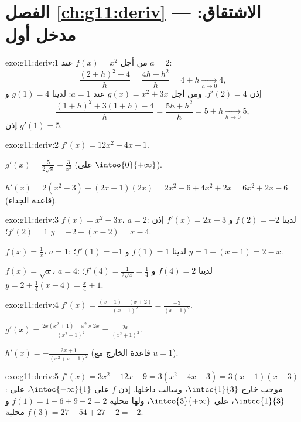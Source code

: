\section*{الفصل \ref{ch:g11:deriv} --- الاشتقاق: مدخل أول}

\begin{solution}{exo:g11:deriv:1}
من أجل $f(x) = x^2$ عند $a = 2$:
\[
\frac{(2+h)^2 - 4}{h} = \frac{4h + h^2}{h} = 4 + h
\xrightarrow[h\to0]{} 4,
\]
إذن $f'(2) = 4$. ومن أجل $g(x) = x^2 + 3x$ عند $a = 1$: لدينا $g(1) = 4$ و
\[
\frac{(1+h)^2 + 3(1+h) - 4}{h} = \frac{5h + h^2}{h} = 5 + h
\xrightarrow[h\to0]{} 5,
\]
إذن $g'(1) = 5$.
\end{solution}

\begin{solution}{exo:g11:deriv:2}
$f'(x) = 12x^2 - 4x + 1$.

$g'(x) = \frac{5}{2\sqrt x} - \frac{3}{x^2}$ (على $\intoo{0}{+\infty}$).

$h'(x) = 2(x^2 - 3) + (2x+1)(2x) = 2x^2 - 6 + 4x^2 + 2x
= 6x^2 + 2x - 6$ (قاعدة الجداء).
\end{solution}

\begin{solution}{exo:g11:deriv:3}
$f(x) = x^2 - 3x$، $a = 2$: لدينا $f(2) = -2$ و $f'(x) = 2x - 3$ إذن $f'(2) = 1$؛
 $y = -2 + (x - 2) = x - 4$.

$f(x) = \frac1x$، $a = 1$: لدينا $f(1) = 1$ و $f'(1) = -1$؛ 
$y = 1 - (x - 1) = 2 - x$.

$f(x) = \sqrt x$، $a = 4$: لدينا $f(4) = 2$ و $f'(4) = \frac{1}{2\sqrt4} =
\frac14$؛  $y = 2 + \frac14(x - 4) = \frac{x}{4} + 1$.
\end{solution}

\begin{solution}{exo:g11:deriv:4}
$f'(x) = \frac{(x-1) - (x+2)}{(x-1)^2} = \frac{-3}{(x-1)^2}$.

$g'(x) = \frac{2x(x^2+1) - x^2 \times 2x}{(x^2+1)^2}
= \frac{2x}{(x^2+1)^2}$.

$h'(x) = -\frac{2x+1}{(x^2+x+1)^2}$ (قاعدة الخارج مع $u = 1$).
\end{solution}

\begin{solution}{exo:g11:deriv:5}
$f'(x) = 3x^2 - 12x + 9 = 3(x^2 - 4x + 3) = 3(x-1)(x-3)$: موجب
خارج $\intcc{1}{3}$، وسالب داخلها. إذن $f$  على
$\intoc{-\infty}{1}$،  على $\intcc{1}{3}$،  على
$\intco{3}{+\infty}$، ولها  محلية $f(1) = 1 - 6 + 9 - 2 = 2$ و
 محلية $f(3) = 27 - 54 + 27 - 2 = -2$.
\end{solution}

